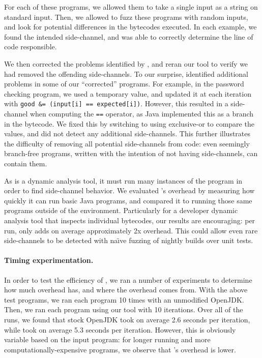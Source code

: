 For each of these programs, we allowed them to take a single input as a string
on standard input. Then, we allowed \jcupid to fuzz these programs with random
inputs, and look for potential differences in the bytecodes executed. In each
example, we found the intended side-channel, and \jcupid was able to correctly
determine the line of code responsible.

We then corrected the problems identified by \jcupid, and reran our tool to
verify we had removed the offending side-channels. To our surprise, \jcupid
identified additional problems in some of our ``corrected'' programs. For example, in
the password checking program, we used a temporary value, and updated it at each
iteration with \texttt{good \&= (input[i] == expected[i])}. However, this resulted in
a side-channel when computing the \texttt{==} operator, as Java implemented this as a
branch in the bytecode. We fixed this by switching to using exclusive-or to
compare the values, and \jcupid did not detect any additional side-channels. This
further illustrates the difficulty of removing all potential side-channels from
code: even seemingly branch-free programs, written with the intention of not
having side-channels, can contain them.


As \jcupid is a dynamic analysis tool, it must run many instances of the program
in order to find side-channel behavior. We evaluated \jcupid's overhead by
measuring how quickly it can run basic Java programs, and compared it to
running those same programs outside of the \jcupid environment. Particularly for
a developer dynamic analysis tool that inspects individual bytecodes, our
results are encouraging: per run, \jcupid only adds on average approximately 2x
overhead. This could allow even rare side-channels to be detected with
na\"{\i}ve fuzzing of nightly builds over unit tests.

\paragraph{Timing experimentation.}
In order to test the efficiency of \jcupid, we ran a number of experiments to
determine how much overhead \jcupid has, and where the overhead comes from.
With the above test programs, we ran each program 10 times with an unmodified
OpenJDK. Then, we ran each program using our tool with 10 iterations. Over all
of the runs, we found that stock OpenJDK took on average 2.6 seconds per
iteration, while \jcupid took on average 5.3 seconds per iteration. However, this
is obviously variable based on the input program: for longer running and more
computationally-expensive programs, we observe that \jcupid's overhead is lower.

